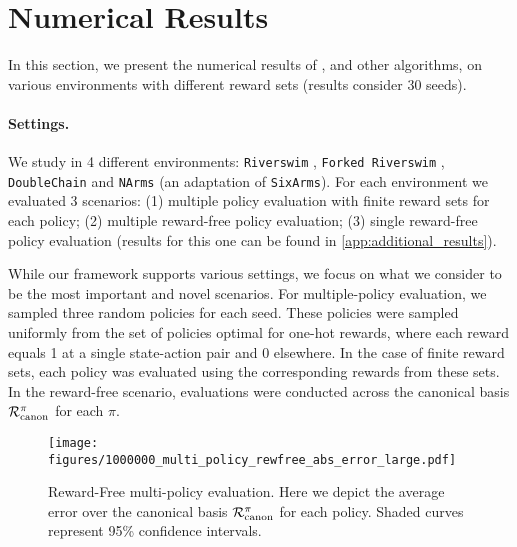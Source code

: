 \section{Numerical Results}\label{sec:num_results}
In this section, we present the numerical results  of \mrnas{}, and other algorithms, on various environments with different reward sets (results consider $30$ seeds).

\paragraph{Settings.} We study \mrnas{} in 4 different environments: {\tt Riverswim} \cite{strehl2004empirical}, {\tt Forked Riverswim} \cite{russo2023model}, {\tt DoubleChain} \cite{Kaufmann21a} and {\tt NArms} \cite{strehl2004empirical} (an adaptation of {\tt SixArms}). For each environment we evaluated 3 scenarios: (1) multiple policy evaluation with finite reward sets for each policy; (2) multiple reward-free policy evaluation; (3) single reward-free policy evaluation (results for this one can be found in \cref{app:additional_results}). 

While our framework supports various settings, we focus on what we consider to be the most important and novel scenarios. For multiple-policy evaluation, we sampled three random policies for each seed. These policies were sampled uniformly from the set of policies optimal for one-hot rewards, where each reward equals 1 at a single state-action pair and 0 elsewhere. In the case of finite reward sets, each policy was evaluated using the corresponding rewards from these sets. In the reward-free scenario, evaluations were conducted across the canonical basis ${\cal R}_{\rm canon}^\pi$ for each $\pi$. 

\begin{figure}[t]
    \centering    \texttt{[image: figures/1000000\_multi\_policy\_rewfree\_abs\_error\_large.pdf]}
    \caption{Reward-Free multi-policy evaluation. Here we depict the average error over the canonical basis  ${\cal R}_{\rm canon}^\pi$ for each policy. Shaded curves represent 95\% confidence intervals.}\label{fig:multi_policy_rewardfree}
\end{figure}

